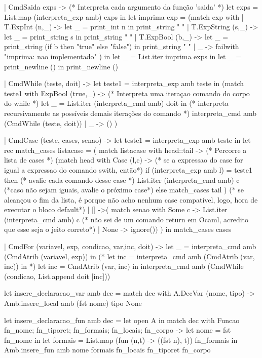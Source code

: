 \documentclass[12pt,a4paper,twoside]{article}
\begin{document}
\begin{terminal}
  | CmdSaida exps ->
    (* Interpreta cada argumento da função 'saida' *)
    let exps = List.map (interpreta_exp amb) exps in
    let imprima exp =
      (match exp with
       | T.ExpInt (n,_) ->      let _ = print_int n in print_string " "
       | T.ExpString (s,_) -> let _ = print_string s in print_string " "
       | T.ExpBool (b,_) ->
         let _ = print_string (if b then "true" else "false")
         in print_string " "
       | _ -> failwith "imprima: nao implementado"
      )
    in
    let _ = List.iter imprima exps in
    let _ = print_newline () in 
      print_newline ()
  
   
  | CmdWhile (teste, doit) ->
     let teste1 = interpreta_exp amb teste in
   (match teste1 with
       ExpBool (true,_) ->
       (* Interpreta uma iteraçao comando do corpo do while *)
       let _ = List.iter (interpreta_cmd amb) doit in 
       (* interpreta recursivamente as possíveis demais iterações do comando *)
        interpreta_cmd amb (CmdWhile (teste, doit))
       | _ -> ()
   )

  | CmdCase (teste, cases, senao) ->
     let teste1 = interpreta_exp amb teste in
    let rec match_cases listacase = ( match listacase with 
      head::tail ->
      (* Percorre a lista de cases *)
      (match head with Case (l,c) ->
      (* se a expressao do case for igual 
      a expressao do comando swith, então*)
       if (interpreta_exp amb l) = teste1 then 
        (* avalie cada comando desse case *)
        List.iter (interpreta_cmd amb) c
        (*caso não sejam iguais, avalie o próximo case*)
        else match_cases tail )
        (* se alcançou o fim da lista, é porque não acho nenhum case compatível,
        logo, hora de executar o bloco default*)
      | [] ->( match senao with 
        Some c -> 
        List.iter (interpreta_cmd amb) c
        (* não sei de um comando return em Ocaml,
         acredito que esse seja o jeito correto*)
        | None -> ignore()) )
    in match_cases cases

    | CmdFor (variavel, exp, condicao, var,inc, doit) ->
    let _ = interpreta_cmd amb (CmdAtrib (variavel, exp)) in
    (* let inc = interpreta_cmd amb (CmdAtrib (var, inc)) in *)
    let inc = CmdAtrib (var, inc) in
    interpreta_cmd amb (CmdWhile (condicao, List.append doit [inc]))
  

let insere_declaracao_var amb dec =
    match dec with
        A.DecVar (nome, tipo) ->  Amb.insere_local amb (fst nome) tipo None

let insere_declaracao_fun amb dec =
  let open A in
    match dec with
      Funcao {fn_nome; fn_tiporet; fn_formais; fn_locais; fn_corpo} ->
        let nome = fst fn_nome in
        let formais = List.map (fun (n,t) -> ((fst n), t)) fn_formais in
        Amb.insere_fun amb nome formais fn_locais fn_tiporet fn_corpo



\end{terminal}
\end{document}
